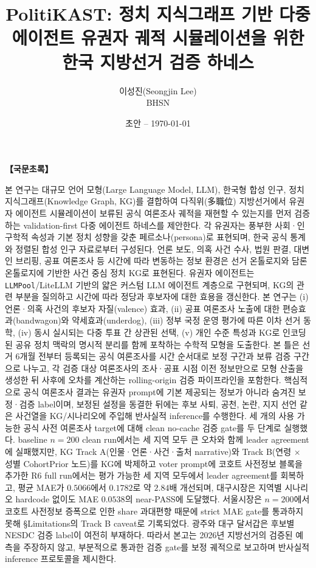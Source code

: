 \documentclass[11pt]{article}
\title{PolitiKAST: 정치 지식그래프 기반 다중 에이전트 유권자 궤적 시뮬레이션을 위한 한국 지방선거 검증 하네스}
\author{이성진(Seongjin Lee)\\BHSN}
\date{초안 -- \today}
\begin{document}
\maketitle

\begin{center}
\textbf{【국문초록】}
\end{center}
\noindent 본 연구는 대규모 언어 모형(Large Language Model, LLM), 한국형 합성 인구, 정치 지식그래프(Knowledge Graph, KG)를 결합하여 다직위(多職位) 지방선거에서 유권자 에이전트 시뮬레이션이 보류된 공식 여론조사 궤적을 재현할 수 있는지를 먼저 검증하는 validation-first 다중 에이전트 하네스를 제안한다. 각 유권자는 풍부한 사회·인구학적 속성과 기본 정치 성향을 갖춘 페르소나(persona)로 표현되며, 한국 공식 통계와 정렬된 합성 인구 자료로부터 구성된다. 언론 보도, 의혹 사건 수사, 법원 판결, 대변인 브리핑, 공표 여론조사 등 시간에 따라 변동하는 정보 환경은 선거 온톨로지와 담론 온톨로지에 기반한 사건 중심 정치 KG로 표현된다. 유권자 에이전트는 \texttt{LLMPool}/LiteLLM 기반의 얇은 커스텀 LLM 에이전트 계층으로 구현되며, KG의 관련 부분을 질의하고 시간에 따라 정당과 후보자에 대한 효용을 갱신한다. 본 연구는 (i) 언론·의혹 사건의 후보자 자질(valence) 효과, (ii) 공표 여론조사 노출에 대한 편승효과(bandwagon)와 약세효과(underdog), (iii) 정부 국정 운영 평가에 따른 이차 선거 동학, (iv) 동시 실시되는 다중 투표 간 상관된 선택, (v) 개인 수준 특성과 KG로 인코딩된 공유 정치 맥락의 명시적 분리를 함께 포착하는 수학적 모형을 도출한다. 본 틀은 선거 6개월 전부터 등록되는 공식 여론조사를 시간 순서대로 보정 구간과 보류 검증 구간으로 나누고, 각 검증 대상 여론조사의 조사·공표 시점 이전 정보만으로 모형 산출을 생성한 뒤 사후에 오차를 계산하는 rolling-origin 검증 파이프라인을 포함한다. 핵심적으로 공식 여론조사 결과는 유권자 prompt에 기본 제공되는 정보가 아니라 숨겨진 보정·검증 label이며, 보정된 설정을 동결한 뒤에는 후보 사퇴, 공천, 논란, 지지 선언 같은 사건열을 KG/시나리오에 주입해 반사실적 inference를 수행한다. 세 개의 사용 가능한 공식 사전 여론조사 target에 대해 clean no-cache 검증 gate를 두 단계로 실행했다. baseline $n{=}200$ clean run에서는 세 지역 모두 큰 오차와 함께 leader agreement에 실패했지만, KG Track A(인물·언론·사건·출처 narrative)와 Track B(연령 $\times$ 성별 CohortPrior 노드)를 KG에 박제하고 voter prompt에 코호트 사전정보 블록을 추가한 R6 full run에서는 평가 가능한 세 지역 모두에서 leader agreement를 회복하고, 평균 MAE가 $0.5066$에서 $0.1782$로 약 $2.84$배 개선되며, 대구시장은 지역별 시나리오 hardcode 없이도 MAE $0.0538$의 near-PASS에 도달했다. 서울시장은 $n{=}200$에서 코호트 사전정보 증폭으로 인한 share 과대편향 때문에 strict MAE gate를 통과하지 못해 §Limitations의 Track B caveat로 기록되었다. 광주와 대구 달서갑은 후보별 NESDC 검증 label이 여전히 부재하다. 따라서 본고는 2026년 지방선거의 검증된 예측을 주장하지 않고, 부분적으로 통과한 검증 gate를 보정 궤적으로 보고하며 반사실적 inference 프로토콜을 제시한다.
\end{document}
